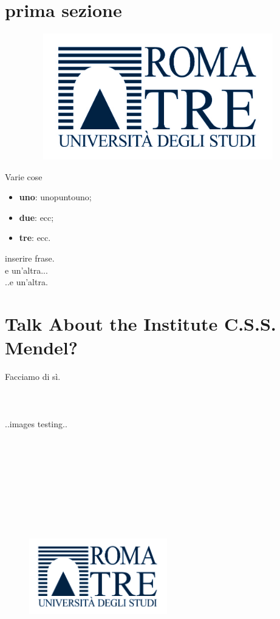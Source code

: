 \documentclass[a4paper]{report}
\begin{document}
\section{prima sezione}
\begin{figure}[b]
\centering
\includegraphics[height=5.5cm, width=11.5cm]{logoRomaTre.jpg}
\end{figure}
Varie cose
\begin{itemize}
    \item \textbf{uno}: unopuntouno;
    \item \textbf{due}: ecc;
    \item \textbf{tre}: ecc.
\end{itemize}
inserire frase.\\
e un'altra... \\
..e un'altra. \\

\section{Talk About the Institute C.S.S. Mendel?}
Facciamo di sì.\\
\\\\\\
..images testing..
\begin{figure}[h]
\centering
\includegraphics[height=12cm, width=6cm]{logoRomaTre.jpg}
\end{figure}
\end{document}
